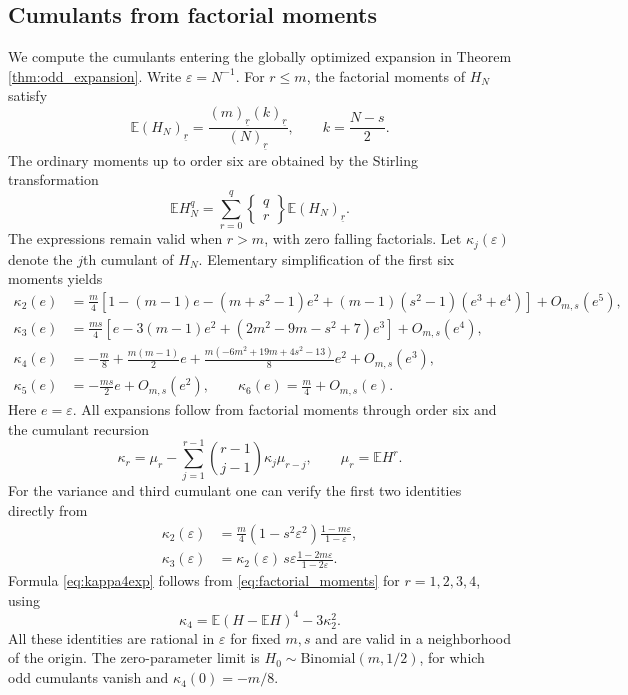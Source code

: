 \documentclass[11pt,a4paper]{article}
\newcommand{\E}{\mathbb E}\newcommand{\R}{\mathbb R}\newcommand{\N}{\mathbb N}\newcommand{\one}{\mathbf1}
\begin{document}
\subsection{Cumulants from factorial moments}\label{sec:cumulants_odd}
We compute the cumulants entering the globally optimized expansion in Theorem \ref{thm:odd_expansion}. Write $\varepsilon=N^{-1}$. For $r\le m$, the factorial moments of $H_N$ satisfy
\begin{equation}\label{eq:factorial_moments}
 \E(H_N)_{\underline r}
 =\frac{(m)_{\underline r}(k)_{\underline r}}
 {(N)_{\underline r}},\qquad k=\frac{N-s}{2}.
\end{equation}
The ordinary moments up to order six are obtained by the Stirling transformation
\[
 \E H_N^q=\sum_{r=0}^q\left\{\begin{matrix}q\\r\end{matrix}\right\}
 \E(H_N)_{\underline r}.
\]
The expressions remain valid when $r>m$, with zero falling factorials. Let $\kappa_j(\varepsilon)$ denote the $j$th cumulant of $H_N$. Elementary simplification of the first six moments yields
\begin{align}
 \kappa_2(e)&=\frac m4\left[1-(m-1)e-(m+s^2-1)e^2
 +(m-1)(s^2-1)(e^3+e^4)\right]+O_{m,s}(e^5),\label{eq:kappa2exp}\\
 \kappa_3(e)&=\frac{ms}{4}\left[e-3(m-1)e^2
 +(2m^2-9m-s^2+7)e^3\right]+O_{m,s}(e^4),\label{eq:kappa3exp}\\
 \kappa_4(e)&=-\frac m8+\frac{m(m-1)}2e
 +\frac{m(-6m^2+19m+4s^2-13)}8e^2+O_{m,s}(e^3),\label{eq:kappa4exp}\\
 \kappa_5(e)&=-\frac{ms}{2}e+O_{m,s}(e^2),\qquad
 \kappa_6(e)=\frac m4+O_{m,s}(e).\label{eq:kappa56exp}
\end{align}
Here $e=\varepsilon$. All expansions follow from factorial moments through order six and the cumulant recursion
\[
 \kappa_r=\mu_r-\sum_{j=1}^{r-1}\binom{r-1}{j-1}\kappa_j\mu_{r-j},
 \qquad \mu_r=\E H^r.
\]
For the variance and third cumulant one can verify the first two identities directly from
\begin{align}
 \kappa_2(\varepsilon)
 &=\frac m4(1-s^2\varepsilon^2)\frac{1-m\varepsilon}{1-\varepsilon},\label{eq:exactk2}\\
 \kappa_3(\varepsilon)
 &=\kappa_2(\varepsilon)\,s\varepsilon
 \frac{1-2m\varepsilon}{1-2\varepsilon}.
 \label{eq:exactk3}
\end{align}
Formula \eqref{eq:kappa4exp} follows from \eqref{eq:factorial_moments} for $r=1,2,3,4$, using
\[
 \kappa_4=\E(H-\E H)^4-3\kappa_2^2.
\]
All these identities are rational in $\varepsilon$ for fixed $m,s$ and are valid in a neighborhood of the origin. The zero-parameter limit is $H_0\sim\mathrm{Binomial}(m,1/2)$, for which odd cumulants vanish and $\kappa_4(0)=-m/8$.
\end{document}
